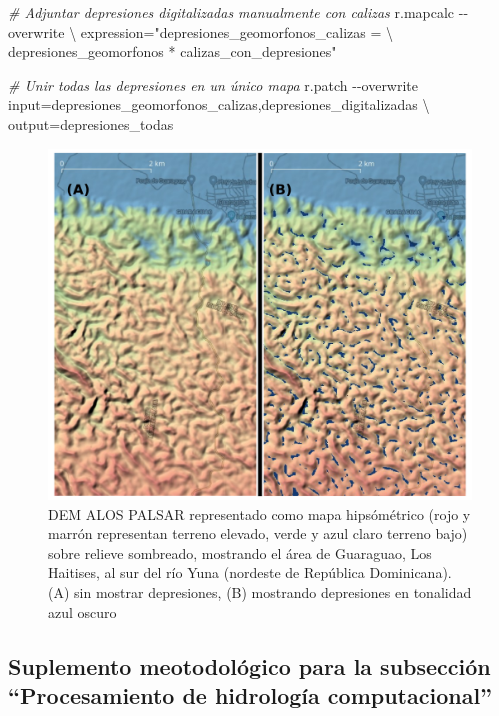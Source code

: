 \documentclass[spanish]{article}
\newenvironment{Shaded}{\begin{snugshade}}{\end{snugshade}}
\newcommand{\AttributeTok}[1]{\textcolor[rgb]{0.77,0.63,0.00}{#1}}
\newcommand{\CommentTok}[1]{\textcolor[rgb]{0.56,0.35,0.01}{\textit{#1}}}
\newcommand{\DataTypeTok}[1]{\textcolor[rgb]{0.13,0.29,0.53}{#1}}
\newcommand{\ExtensionTok}[1]{#1}
\newcommand{\NormalTok}[1]{#1}
\newcommand{\StringTok}[1]{\textcolor[rgb]{0.31,0.60,0.02}{#1}}
\begin{document}
\begin{Shaded}
\begin{Highlighting}[]
\CommentTok{\# Adjuntar depresiones digitalizadas manualmente con calizas}
\ExtensionTok{r.mapcalc} \AttributeTok{{-}{-}overwrite} \DataTypeTok{\textbackslash{}}
\NormalTok{  expression=}\StringTok{"\textquotesingle{}depresiones\_geomorfonos\_calizas\textquotesingle{} = }\DataTypeTok{\textbackslash{}}
\StringTok{              \textquotesingle{}depresiones\_geomorfonos\textquotesingle{} * \textquotesingle{}calizas\_con\_depresiones\textquotesingle{}"}

\CommentTok{\# Unir todas las depresiones en un único mapa}
\ExtensionTok{r.patch} \AttributeTok{{-}{-}overwrite}\NormalTok{ input=depresiones\_geomorfonos\_calizas,depresiones\_digitalizadas }\DataTypeTok{\textbackslash{}}
\NormalTok{  output=depresiones\_todas}
\end{Highlighting}
\end{Shaded}

\begin{figure}

{\centering \includegraphics[width=0.8\linewidth]{figuras/depresiones} 

}

\caption{DEM ALOS PALSAR representado como mapa hipsómétrico (rojo y marrón representan terreno elevado, verde y azul claro terreno bajo) sobre relieve sombreado, mostrando el área de Guaraguao, Los Haitises, al sur del río Yuna (nordeste de República Dominicana). (A) sin mostrar depresiones, (B) mostrando depresiones en tonalidad azul oscuro}\label{fig:depresiones}
\end{figure}

\hypertarget{suplemento-meotodoluxf3gico-para-la-subsecciuxf3n-procesamiento-de-hidrologuxeda-computacional}{%
\subsection*{Suplemento meotodológico para la subsección ``Procesamiento
de hidrología
computacional''}\label{suplemento-meotodoluxf3gico-para-la-subsecciuxf3n-procesamiento-de-hidrologuxeda-computacional}}
\end{document}
